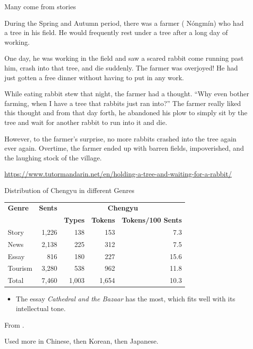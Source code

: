 \documentclass[xetex]{beamer}
\begin{document}
     \begin{frame}{Many come from stories}

     
  During the Spring and Autumn period, there was a farmer ( Nóngmín) who had a tree in his field. He would frequently rest under a tree after a long day of working.

One day, he was working in the field and saw a scared rabbit come running past him, crash into that tree, and die suddenly. The farmer was overjoyed! He had just gotten a free dinner without having to put in any work.

While eating rabbit stew that night, the farmer had a thought. “Why even bother farming, when I have a tree that rabbits just ran into?” The farmer really liked this thought and from that day forth, he abandoned his plow to simply sit by the tree and wait for another rabbit to run into it and die.

However, to the farmer’s surprise, no more rabbits crashed into the tree again ever again. Overtime, the farmer ended up with barren fields, impoverished, and the laughing stock of the village.


\url{https://www.tutormandarin.net/en/holding-a-tree-and-waiting-for-a-rabbit/}
\end{frame}

\begin{frame}{Distribution of Chengyu in different Genres}
    \begin{center}
      \begin{tabular}{lrrrr}
        \textbf{Genre} & \textbf{Sents} &
        \multicolumn{3}{c}{\textbf{Chengyu}} \\
        &  &
        \textbf{Types} &  
        \textbf{Tokens} &  \textbf{Tokens/100 Sents} \\
        \hline
        Story   &  1,226  &   138  &    153  & 7.3 \\
        News    &  2,138  &   225  &    312  & 7.5 \\
        Essay   &    816  &   180  &    227  & 15.6 \\
        Tourism &  3,280  &   538  &    962  & 11.8 \\
        \hline
        Total   &  7,460  &  1,003  &  1,654  & 10.3 \\
      \end{tabular}
    \end{center}
    \begin{itemize}
    \item The essay \textit{Cathedral and the Bazaar} has the most,
      which fits well with its intellectual tone.
    \end{itemize}

    From \citet{Ho:Kng:Wang:Bond:2014}.

    Used more in Chinese, then Korean, then Japanese.
  \end{frame}
  
\end{document}
